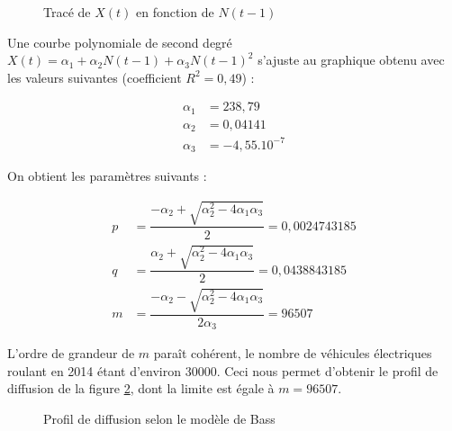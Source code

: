 \documentclass[10pt]{article}
\begin{document}
		\begin{figure}[h!]
			\caption{Tracé de $X(t)$ en fonction de $N(t-1)$ \label{fig.courbeXt} }
			\begin{center}
			\end{center}
			
		\end{figure}
		
		
		Une courbe polynomiale de second degré $X(t) = \alpha_1 + \alpha_2 N(t-1) + \alpha_3 N(t-1)^2$ s'ajuste au graphique obtenu avec les valeurs suivantes (coefficient $R^2 = 0,49$) :
		
		\begin{align*}
			\alpha_1 &= 238,79\\
			\alpha_2 &= 0,04141\\
			\alpha_3 &= -4,55.10^{-7}
		\end{align*}

		On obtient les paramètres suivants :

		\begin{align*}
			p &= \dfrac{-\alpha_2 + \sqrt{\alpha_2^2 - 4 \alpha_1 \alpha_3}}{2} = 0,0024743185\\
			q &= \dfrac{\alpha_2 + \sqrt{\alpha_2^2 - 4 \alpha_1 \alpha_3}}{2} = 0,0438843185\\
			m &= \dfrac{-\alpha_2 - \sqrt{\alpha_2^2 - 4 \alpha_1 \alpha_3}}{2 \alpha_3} = 96507
		\end{align*}

		L'ordre de grandeur de $m$ paraît cohérent, le nombre de véhicules électriques roulant en 2014 étant d'environ 30000. Ceci nous permet d'obtenir le profil de diffusion de la figure \ref{fig.courbeBass1}, dont la limite est égale à $m = 96507$.

		\begin{figure}[h!]
			\caption{Profil de diffusion selon le modèle de Bass \label{fig.courbeBass1}}
			\begin{center}
			\end{center}
			
		\end{figure}
\end{document}
